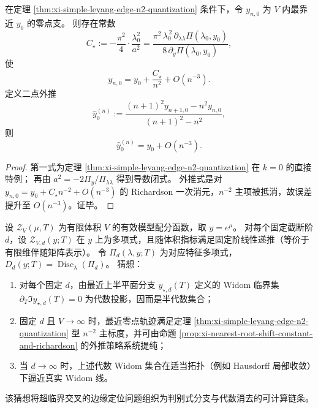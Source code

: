 \begin{proposition}[最近零点位移常数的导数闭式与二点体积外推]\label{prop:xi-nearest-root-shift-constant-and-richardson}
在定理 \ref{thm:xi-simple-leyang-edge-n2-quantization} 条件下，令 \(y_{n,0}\) 为 \(V\) 内最靠近 \(y_0\) 的零点支。
则存在常数
\[
C_\star
:=
-\frac{\pi^2}{4}\cdot\frac{\lambda_0^2}{a^2}
=
\frac{\pi^2\,\lambda_0^{\,2}\,\partial_{\lambda\lambda}\Pi(\lambda_0,y_0)}
{8\,\partial_y\Pi(\lambda_0,y_0)},
\]
使
\[
y_{n,0}=y_0+\frac{C_\star}{n^2}+O(n^{-3}).
\]
定义二点外推
\[
\widehat y_0^{(n)}
:=
\frac{(n+1)^2y_{n+1,0}-n^2y_{n,0}}{(n+1)^2-n^2},
\]
则
\[
\widehat y_0^{(n)}=y_0+O(n^{-3}).
\]
\end{proposition}
\begin{proof}
第一式为定理 \ref{thm:xi-simple-leyang-edge-n2-quantization} 在 \(k=0\) 的直接特例；
再由
\(
a^2=-2\Pi_y/\Pi_{\lambda\lambda}
\)
得到导数闭式。
外推式是对
\(
y_{n,0}=y_0+C_\star n^{-2}+O(n^{-3})
\)
的 Richardson 一次消元，\(n^{-2}\) 主项被抵消，故误差提升至 \(O(n^{-3})\)。证毕。
\end{proof}

\begin{conjecture}\label{conj:xi-effective-partition-widom-algebraic-closure}
设 \(\mathcal Z_V(\mu,T)\) 为有限体积 \(V\) 的有效模型配分函数，取 \(y=e^\mu\)。
对每个固定截断阶 \(d\)，设 \(\mathcal Z_{V,d}(y;T)\) 在 \(y\) 上为多项式，且随体积指标满足固定阶线性递推（等价于有限维伴随矩阵表示）。
令 \(\Pi_d(\lambda,y;T)\) 为对应特征多项式，\(D_d(y;T)=\operatorname{Disc}_\lambda(\Pi_d)\)。
猜想：
\begin{enumerate}
  \item 对每个固定 \(d\)，由最近上半平面分支 \(y_{\star,d}(T)\) 定义的 Widom 临界集
  \(
  \partial_T\Im y_{\star,d}(T)=0
  \)
  为代数投影，因而是半代数集合；
  \item 固定 \(d\) 且 \(V\to\infty\) 时，最近零点轨迹满足定理 \ref{thm:xi-simple-leyang-edge-n2-quantization} 型 \(n^{-2}\) 主标度，并可由命题 \ref{prop:xi-nearest-root-shift-constant-and-richardson} 的外推策略系统提纯；
  \item 当 \(d\to\infty\) 时，上述代数 Widom 集合在适当拓扑（例如 Hausdorff 局部收敛）下逼近真实 Widom 线。
\end{enumerate}
该猜想将超临界交叉的边缘定位问题组织为判别式分支与代数消去的可计算链条。
\end{conjecture}

\endinput
